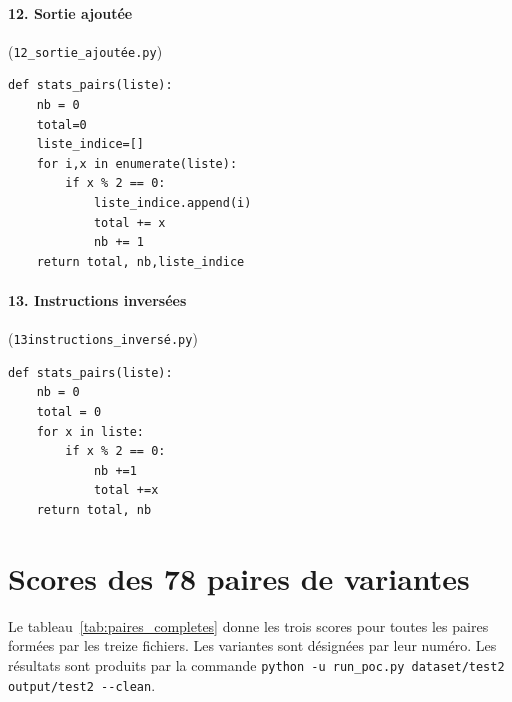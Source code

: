 \documentclass[12pt,a4paper,oneside]{report}
\begin{document}
\paragraph{12. Sortie ajoutée} (\texttt{12\_sortie\_ajoutée.py})
\begin{lstlisting}[style=pyncst]
def stats_pairs(liste):
    nb = 0
    total=0
    liste_indice=[]
    for i,x in enumerate(liste):
        if x % 2 == 0:
            liste_indice.append(i)
            total += x
            nb += 1
    return total, nb,liste_indice
\end{lstlisting}

\paragraph{13. Instructions inversées} (\texttt{13instructions\_inversé.py})
\begin{lstlisting}[style=pyncst]
def stats_pairs(liste):
    nb = 0
    total = 0
    for x in liste:
        if x % 2 == 0:
            nb +=1
            total +=x
    return total, nb
\end{lstlisting}

\section{Scores des 78 paires de variantes}
\label{ann:paires}

Le tableau~\ref{tab:paires_completes} donne les trois scores pour toutes les
paires formées par les treize fichiers. Les variantes sont désignées par leur
numéro. Les résultats sont produits par la commande
\texttt{python -u run\_poc.py dataset/test2 output/test2 -{}-clean}.
\end{document}

